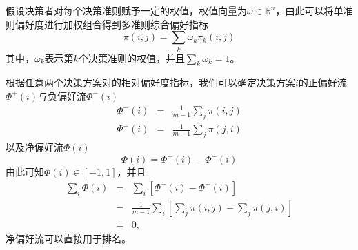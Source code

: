 假设决策者对每个决策准则赋予一定的权值，权值向量为$\omega\in\mathbb R^n$，由此可以将单准则偏好度进行加权组合得到多准则综合偏好指标
\begin{equation}
    \pi(i,j) = \sum\limits_k \omega_k \pi_k(i,j)
\end{equation}
其中，$\omega_k$表示第$k$个决策准则的权值，并且$\sum\limits_k \omega_k = 1$。

根据任意两个决策方案对的相对偏好度指标，我们可以确定决策方案$i$的正偏好流$\Phi^+(i)$与负偏好流$\Phi^-(i)$
\begin{eqnarray}
  \Phi^+(i) &=& \frac{1}{m-1}\sum\limits_j \pi(i,j) \\
  \Phi^-(i) &=& \frac{1}{m-1}\sum\limits_j \pi(j,i)
\end{eqnarray}
以及净偏好流$\Phi(i)$
\begin{equation}
    \Phi(i) = \Phi^+(i) - \Phi^-(i)
\end{equation}
由此可知$\Phi(i)\in[-1,1]$，并且
\begin{equation}
    \begin{array}{lll}
      \sum\limits_i \Phi(i) & = & \sum\limits_i [\Phi^+(i) - \Phi^-(i)]\\
      & = & \frac{1}{m-1} \sum\limits_i [\sum\limits_j \pi(i,j) - \sum\limits_j \pi(j,i)] \\
      & = & 0,
    \end{array}
\end{equation}
净偏好流可以直接用于排名。

